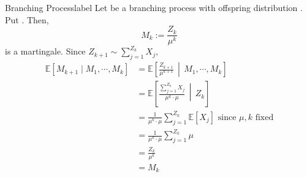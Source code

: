 \documentclass{tufte-handout}
\begin{document}
\begin{ex}{Branching Process}{label}
  Let  be a branching process with offspring distribution . Put . Then,
  \[M_k := \frac{Z_k}{\mu^k}\]
  \noindent is a martingale. Since $Z_{k+1} \sim \sum_{j=1}^{Z_k} X_j$,
  \begin{align*}
    \mathbb{E}[M_{k+1} \mid M_1, \cdots, M_k]
    &= \mathbb{E}\left[\frac{Z_{k+1}}{\mu^{k+1}} \,\middle\vert\, M_1, \cdots, M_k \right] \\
    &= \mathbb{E}\left[\frac{\sum_{j=1}^{Z_k} X_j}{\mu^k \cdot \mu} \,\middle\vert\, Z_k \right] \\
    &= \frac{1}{\mu^k \cdot \mu} \sum_{j=1}^{Z_k} \mathbb{E}[X_j] \text{ since $\mu, k$ fixed}\\
    &= \frac{1}{\mu^k \cdot \mu} \sum_{j=1}^{Z_k} \mu \\
    &= \frac{Z_k}{\mu^k} \\
    &= M_k
  \end{align*}
\end{ex}
\end{document}
